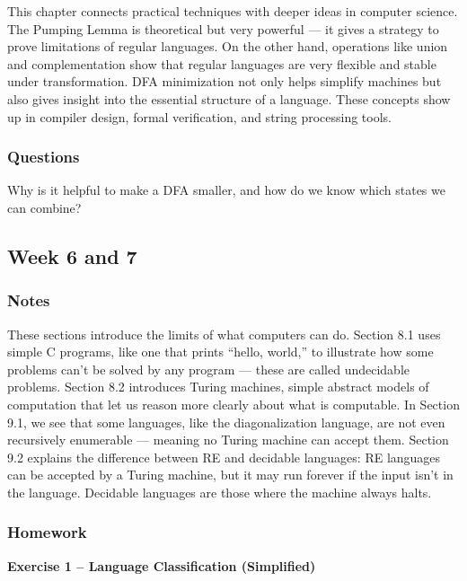 \documentclass{article}
\theoremstyle{theorem}
\theoremstyle{definition}
\theoremstyle{remark}
\begin{document}
This chapter connects practical techniques with deeper ideas in computer science. The Pumping Lemma is theoretical but very powerful — it gives a strategy to prove limitations of regular languages. On the other hand, operations like union and complementation show that regular languages are very flexible and stable under transformation. DFA minimization not only helps simplify machines but also gives insight into the essential structure of a language. These concepts show up in compiler design, formal verification, and string processing tools.

\subsubsection{Questions}

Why is it helpful to make a DFA smaller, and how do we know which states we can combine?

\subsection{Week 6 and 7}

\subsubsection{Notes}

These sections introduce the limits of what computers can do. Section 8.1 uses simple C programs, like one that prints “hello, world,” to illustrate how some problems can’t be solved by any program — these are called undecidable problems. Section 8.2 introduces Turing machines, simple abstract models of computation that let us reason more clearly about what is computable. In Section 9.1, we see that some languages, like the diagonalization language, are not even recursively enumerable — meaning no Turing machine can accept them. Section 9.2 explains the difference between RE and decidable languages: RE languages can be accepted by a Turing machine, but it may run forever if the input isn’t in the language. Decidable languages are those where the machine always halts.



\subsubsection{Homework}

\textbf{Exercise 1 – Language Classification (Simplified)}
\end{document}
